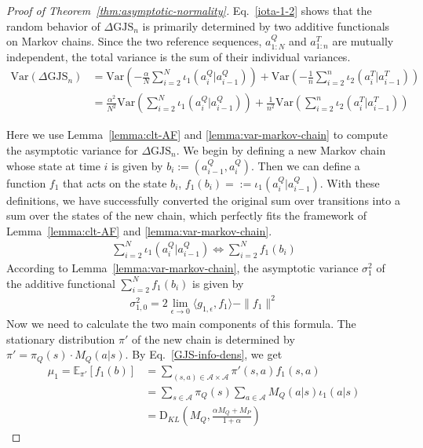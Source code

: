 \documentclass{article}
\theoremstyle{plain}
\theoremstyle{definition}
\theoremstyle{remark}
\begin{document}
\begin{proof}[Proof of Theorem~\ref{thm:asymptotic-normality}]
Eq.~\ref{iota-1-2} shows that the random behavior of $\Delta \text{GJS}_n$ is primarily determined by two additive functionals on Markov chains. Since the two reference sequences, $a^Q_{1:N}$ and $a^T_{1:n}$ are mutually independent, the total variance is the sum of their individual variances. 
\begin{align}
    \text{Var}(\Delta \text{GJS}_n)& = \text{Var} (-\frac{\alpha}{N} \sum_{i=2}^{N} \iota_1(a_i^Q|a_{i-1}^Q))+\text{Var}(-\frac{1}{n} \sum_{i=2}^{n} \iota_2(a^T_{i}|a_{i-1}^T)) \\
    & = \frac{\alpha^2}{N^2}\text{Var} ( \sum_{i=2}^{N} \iota_1(a_i^Q|a_{i-1}^Q)) + \frac{1}{n^2}\text{Var} (\sum_{i=2}^{n} \iota_2(a^T_{i}|a_{i-1}^T))
\end{align}

Here we use Lemma~\ref{lemma:clt-AF} and \ref{lemma:var-markov-chain} to compute the asymptotic variance for $\Delta \text{GJS}_n$. We begin by defining a new Markov chain whose state at time $i$ is given by $b_{i}:=(a^Q_{i-1},a^Q_i)$. Then we can define a function $f_1$ that acts on the state $b_i$, $f_1(b_{i})=:=\iota_1(a^Q_i|a^Q_{i-1})$. With these definitions, we have successfully converted the original sum over transitions into a sum over the states of the new chain, which perfectly fits the framework of Lemma~\ref{lemma:clt-AF} and \ref{lemma:var-markov-chain}.
\begin{align}
    \sum_{i=2}^{N} \iota_1(a^Q_i|a^Q_{i-1}) \Leftrightarrow \sum_{i=2}^{N} f_1(b_i)
\end{align}
According to Lemma~\ref{lemma:var-markov-chain}, the asymptotic variance $\sigma_1^2$ of the additive functional $\sum_{i=2}^{N}f_1(b_i)$ is given by
\begin{align}
    \sigma_{1,0}^2 = 2 \lim_{\epsilon\rightarrow 0} \langle g_{1,\epsilon},f_1 \rangle - \|f_1\|^2 \label{eq:sigma-1-formula}
\end{align}
Now we need to calculate the two main components of this formula.
The stationary distribution $\pi'$ of the new chain is determined by $\pi'=\pi_Q(s)\cdot M_Q(a|s)$.
By Eq.~\ref{GJS-info-dens}, we get \begin{align}
    \mu_1=\mathbb{E}_{\pi'}[f_1(b)]&=\sum_{(s,a) \in \mathcal{A}\times \mathcal{A}} \pi'(s,a)f_1(s,a) 
    \\
    &= \sum_{s \in \mathcal{A}}\pi_Q(s)\sum_{a\in \mathcal{A}}M_Q(a|s)\iota_1(a|s)\\
    &=\text{D}_{KL}(M_Q,\frac{\alpha M_Q+M_P}{1+\alpha})
\end{align}

\end{proof}
\end{document}
